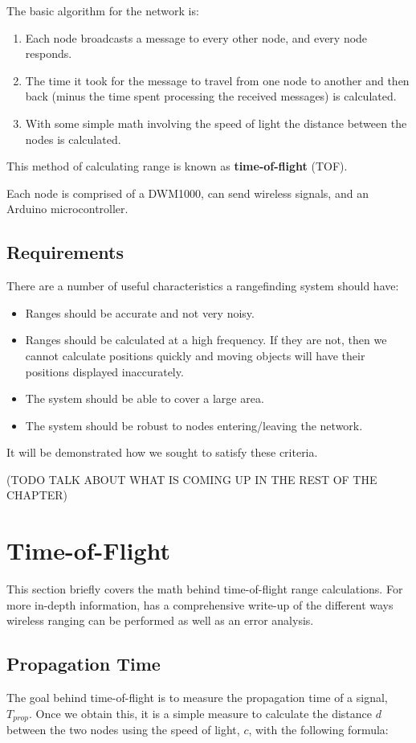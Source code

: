 The basic algorithm for the network is: 
\begin{enumerate}
	\item Each node broadcasts a message to every other node, and every node responds. 
	\item The time it took for the message to travel from one node to another and then back (minus the time spent processing the received messages) is calculated.
	\item With some simple math involving the speed of light the distance between the nodes is calculated. 
\end{enumerate}

This method of calculating range is known as \textbf{time-of-flight} (TOF).

Each node is comprised of a DWM1000, can send wireless signals, and an Arduino microcontroller.

\subsection{Requirements}
There are a number of useful characteristics a rangefinding system should have:
\begin{itemize}
	\item Ranges should be accurate and not very noisy.
	\item Ranges should be calculated at a high frequency. If they are not, then we cannot calculate positions quickly and moving objects will have their positions displayed inaccurately.
	\item The system should be able to cover a large area. 
	\item The system should be robust to nodes entering/leaving the network. 
\end{itemize}

It will be demonstrated how we sought to satisfy these criteria.

(TODO TALK ABOUT WHAT IS COMING UP IN THE REST OF THE CHAPTER)

\section{Time-of-Flight}
This section briefly covers the math behind time-of-flight range calculations. For more in-depth information, \parencite{DW1000UserManual} has a comprehensive write-up of the different ways wireless ranging can be performed as well as an error analysis.

\subsection{Propagation Time}
The goal behind time-of-flight is to measure the propagation time of a signal, $T_{prop}$. Once we obtain this, it is a simple measure to calculate the distance $d$ between the two nodes using the speed of light, $c$, with the following formula:

